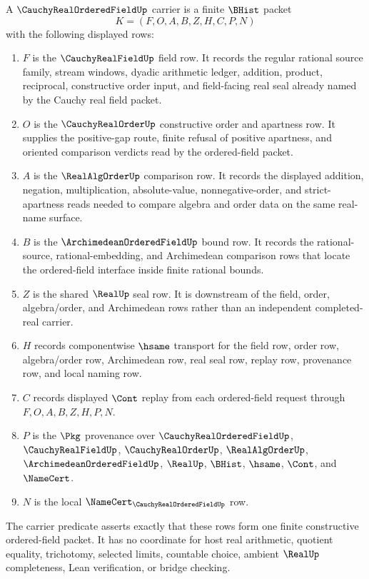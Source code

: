 \begin{definition}
\label{def:cauchy-real-ordered-field-carrier}
A $\CauchyRealOrderedFieldUp$ carrier is a finite $\BHist$ packet
$$
K=(F,O,A,B,Z,H,C,P,N)
$$
with the following displayed rows:
\begin{enumerate}
\item $F$ is the $\CauchyRealFieldUp$ field row. It records the regular rational source family, stream windows, dyadic arithmetic ledger, addition, product, reciprocal, constructive order input, and field-facing real seal already named by the Cauchy real field packet.
\item $O$ is the $\CauchyRealOrderUp$ constructive order and apartness row. It supplies the positive-gap route, finite refusal of positive apartness, and oriented comparison verdicts read by the ordered-field packet.
\item $A$ is the $\RealAlgOrderUp$ comparison row. It records the displayed addition, negation, multiplication, absolute-value, nonnegative-order, and strict-apartness reads needed to compare algebra and order data on the same real-name surface.
\item $B$ is the $\ArchimedeanOrderedFieldUp$ bound row. It records the rational-source, rational-embedding, and Archimedean comparison rows that locate the ordered-field interface inside finite rational bounds.
\item $Z$ is the shared $\RealUp$ seal row. It is downstream of the field, order, algebra/order, and Archimedean rows rather than an independent completed-real carrier.
\item $H$ records componentwise $\hsame$ transport for the field row, order row, algebra/order row, Archimedean row, real seal row, replay row, provenance row, and local naming row.
\item $C$ records displayed $\Cont$ replay from each ordered-field request through $F,O,A,B,Z,H,P,N$.
\item $P$ is the $\Pkg$ provenance over $\CauchyRealOrderedFieldUp$, $\CauchyRealFieldUp$, $\CauchyRealOrderUp$, $\RealAlgOrderUp$, $\ArchimedeanOrderedFieldUp$, $\RealUp$, $\BHist$, $\hsame$, $\Cont$, and $\NameCert$.
\item $N$ is the local $\NameCert_{\CauchyRealOrderedFieldUp}$ row.
\end{enumerate}
The carrier predicate asserts exactly that these rows form one finite constructive ordered-field packet. It has no coordinate for host real arithmetic, quotient equality, trichotomy, selected limits, countable choice, ambient $\RealUp$ completeness, Lean verification, or bridge checking.
\end{definition}


